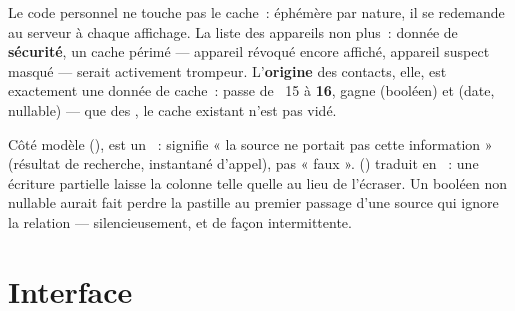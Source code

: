 \begin{note}
Le code personnel ne touche pas le cache~: éphémère par nature, il se redemande au
serveur à chaque affichage. La liste des appareils non plus~: donnée de
\textbf{sécurité}, un cache périmé --- appareil révoqué encore affiché, appareil suspect
masqué --- serait activement trompeur. L'\textbf{origine} des contacts, elle, est
exactement une donnée de cache~:  passe de
~15 à \textbf{16},  gagne 
(booléen) et  (date, nullable) --- que des , le
cache existant n'est pas vidé.
\end{note}

\begin{alerte}
Côté modèle (),  est un ~:
 signifie « la source ne portait pas cette information » (résultat de
recherche, instantané d'appel), pas « faux ». 
() traduit  en ~:
une écriture partielle laisse la colonne telle quelle au lieu de l'écraser. Un booléen
non nullable aurait fait perdre la pastille au premier passage d'une source qui ignore
la relation --- silencieusement, et de façon intermittente.
\end{alerte}

\section{Interface}


